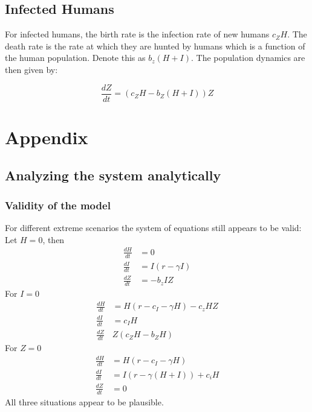 \documentclass[
	12pt
]{article}
\begin{document}
\subsection{Infected Humans}

For infected humans, the birth rate is the infection rate of new humans $c_ZH$. The death rate is the rate at which they are hunted by humans which is a function of the human population. Denote this as $b_z(H+I)$. The population dynamics are then given by:

\begin{equation}
\frac{dZ}{dt} = (c_ZH-b_Z(H+I))Z
\end{equation}

\section{Appendix}
	\subsection{Analyzing the system analytically}
		\subsubsection{Validity of the model}
			For different extreme scenarios the system of equations still appears to be valid:
			Let $H= 0$, then 
			\begin{align*}
				\frac{dH}{dt} &=0\\
				\frac{dI}{dt} &= I(r-\gamma I)\\
				\frac{dZ}{dt} &= -b_z IZ
			\end{align*}
			For $I=0$
			\begin{align*}
				\frac{dH}{dt} &= H(r-c_I-\gamma H)-c_z HZ\\
				\frac{dI}{dt} &= c_IH\\
				\frac{dZ}{dt} & Z(c_ZH-b_ZH)
			\end{align*}
			For $Z=0$
			\begin{align*}
				\frac{dH}{dt} &= H(r-c_I-\gamma H)\\
				\frac{dI}{dt} &= I(r-\gamma(H+I))+c_iH \\
				\frac{dZ}{dt} &= 0
			\end{align*}
			All three situations appear to be plausible.
\end{document}
